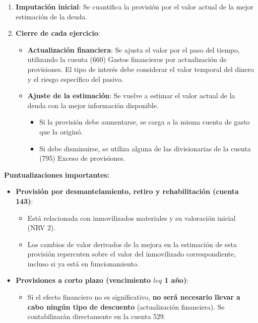 \documentclass[
  paper=a4,
  ,captions=tableheading
]{scrbook}
\providecommand{\tightlist}{%
  \setlength{\itemsep}{0pt}\setlength{\parskip}{0pt}}
\begin{document}
\begin{enumerate}
\def\labelenumi{\arabic{enumi}.}
\tightlist
\item
  \textbf{Imputación inicial}: Se cuantifica la provisión por el valor
  actual de la mejor estimación de la deuda.
\item
  \textbf{Cierre de cada ejercicio}:

  \begin{itemize}
  \tightlist
  \item
    \textbf{Actualización financiera}: Se ajusta el valor por el paso
    del tiempo, utilizando la cuenta (660) Gastos financieros por
    actualización de provisiones. El tipo de interés debe considerar el
    valor temporal del dinero y el riesgo específico del pasivo.
  \item
    \textbf{Ajuste de la estimación}: Se vuelve a estimar el valor
    actual de la deuda con la mejor información disponible.

    \begin{itemize}
    \tightlist
    \item
      Si la provisión debe aumentarse, se carga a la misma cuenta de
      gasto que la originó.
    \item
      Si debe disminuirse, se utiliza alguna de las divisionarias de la
      cuenta (795) Exceso de provisiones.
    \end{itemize}
  \end{itemize}
\end{enumerate}

\textbf{Puntualizaciones importantes:}

\begin{itemize}
\tightlist
\item
  \textbf{Provisión por desmantelamiento, retiro y rehabilitación
  (cuenta 143)}:

  \begin{itemize}
  \tightlist
  \item
    Está relacionada con inmovilizados materiales y su valoración
    inicial (NRV 2).
  \item
    Los cambios de valor derivados de la mejora en la estimación de esta
    provisión repercuten sobre el valor del inmovilizado
    correspondiente, incluso si ya está en funcionamiento.
  \end{itemize}
\item
  \textbf{Provisiones a corto plazo (vencimiento \(leq\) 1 año)}:

  \begin{itemize}
  \tightlist
  \item
    Si el efecto financiero no es significativo, \textbf{no será
    necesario llevar a cabo ningún tipo de descuento} (actualización
    financiera). Se contabilizarán directamente en la cuenta 529.
  \end{itemize}
\end{itemize}
\end{document}
